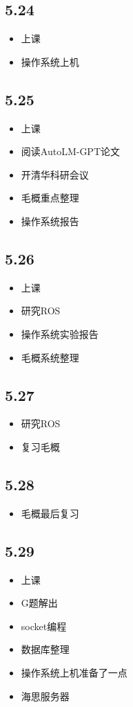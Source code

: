 \documentclass[UTF8]{ctexart}
\begin{document}
\subsection*{5.24}
\begin{itemize}
    \item 上课
    \item 操作系统上机
\end{itemize}
\subsection*{5.25}
\begin{itemize}
    \item 上课
    \item 阅读AutoLM-GPT论文
    \item 开清华科研会议
    \item 毛概重点整理
    \item 操作系统报告
\end{itemize}
\subsection*{5.26}
\begin{itemize}
    \item 上课
    \item 研究ROS
    \item 操作系统实验报告
    \item 毛概系统整理
\end{itemize}
\subsection*{5.27}
\begin{itemize}
    \item 研究ROS
    \item 复习毛概
\end{itemize}
\subsection*{5.28}
\begin{itemize}
    \item 毛概最后复习
\end{itemize}
\subsection*{5.29}
\begin{itemize}
    \item 上课
    \item G题解出
    \item socket编程
    \item 数据库整理
    \item 操作系统上机准备了一点
    \item 海思服务器
\end{itemize}
\end{document}
